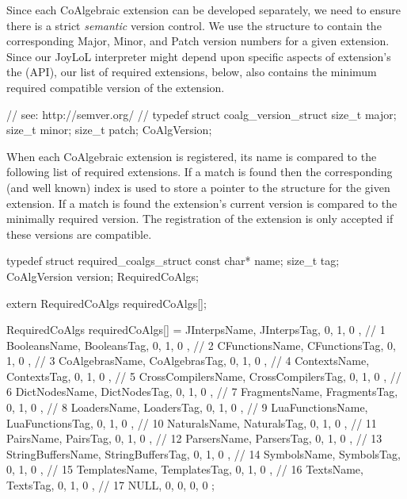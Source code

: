 Since each CoAlgebraic extension can be developed separately, we need to 
ensure there is a strict \emph{semantic} version control. We use the 
 structure to contain the corresponding Major, Minor, 
and Patch version numbers for a given extension. Since our JoyLoL 
interpreter might depend upon specific aspects of extension's the 
 (API), our list of required 
extensions, below, also contains the minimum required compatible version 
of the extension. 

\startCHeader
// see: http://semver.org/
//
typedef struct coalg_version_struct {
  size_t major;
  size_t minor;
  size_t patch;
} CoAlgVersion;
\stopCHeader

When each CoAlgebraic extension is registered, its name is compared to the 
following list of required extensions. If a match is found then the 
corresponding (and well known) index is used to store a pointer to the 
 structure for the given extension. If a match is found 
the extension's current version is compared to the minimally required 
version. The registration of the extension is only accepted if these 
versions are compatible. 

\startCHeader
typedef struct required_coalgs_struct {
  const char*  name;
  size_t       tag;
  CoAlgVersion version;
} RequiredCoAlgs;

extern RequiredCoAlgs requiredCoAlgs[];
\stopCHeader
{}

\startCCode
RequiredCoAlgs requiredCoAlgs[] = {
  { JInterpsName,       JInterpsTag,       {0, 1, 0 }}, //  1
  { BooleansName,       BooleansTag,       {0, 1, 0 }}, //  2
  { CFunctionsName,     CFunctionsTag,     {0, 1, 0 }}, //  3
  { CoAlgebrasName,     CoAlgebrasTag,     {0, 1, 0 }}, //  4
  { ContextsName,       ContextsTag,       {0, 1, 0 }}, //  5
  { CrossCompilersName, CrossCompilersTag, {0, 1, 0 }}, //  6
  { DictNodesName,      DictNodesTag,      {0, 1, 0 }}, //  7
  { FragmentsName,      FragmentsTag,      {0, 1, 0 }}, //  8
  { LoadersName,        LoadersTag,        {0, 1, 0 }}, //  9
  { LuaFunctionsName,   LuaFunctionsTag,   {0, 1, 0 }}, // 10
  { NaturalsName,       NaturalsTag,       {0, 1, 0 }}, // 11
  { PairsName,          PairsTag,          {0, 1, 0 }}, // 12
  { ParsersName,        ParsersTag,        {0, 1, 0 }}, // 13
  { StringBuffersName,  StringBuffersTag,  {0, 1, 0 }}, // 14
  { SymbolsName,        SymbolsTag,        {0, 1, 0 }}, // 15
  { TemplatesName,      TemplatesTag,      {0, 1, 0 }}, // 16
  { TextsName,          TextsTag,          {0, 1, 0 }}, // 17
  { NULL,               0,                 {0, 0, 0 }}
};
\stopCCode

